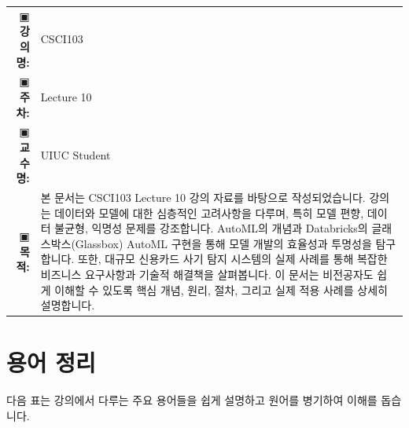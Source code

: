 \documentclass[11pt,a4paper]{article}
\makeatletter
\theoremstyle{definition}
\newcommand{\metainfo}[4]{
\begin{tcolorbox}[
    colback=lightpurple,
    colframe=darkpurple,
    boxrule=1pt,
    arc=2mm,
    left=10pt,
    right=10pt,
    top=8pt,
    bottom=8pt
]
\begin{tabular}{@{}rl@{}}
▣ \textbf{강의명:} & #1 \\[0.3em]
▣ \textbf{주차:} & #2 \\[0.3em]
▣ \textbf{교수명:} & #3 \\[0.3em]
▣ \textbf{목적:} & \begin{minipage}[t]{0.75\textwidth}#4\end{minipage}
\end{tabular}
\end{tcolorbox}
}
\makeatother
\begin{document}
\thispagestyle{firstpage}

\metainfo{CSCI103}{Lecture 10}{UIUC Student}{본 문서는 CSCI103 Lecture 10 강의 자료를 바탕으로 작성되었습니다. 강의는 데이터와 모델에 대한 심층적인 고려사항을 다루며, 특히 모델 편향, 데이터 불균형, 익명성 문제를 강조합니다. AutoML의 개념과 Databricks의 글래스박스(Glassbox) AutoML 구현을 통해 모델 개발의 효율성과 투명성을 탐구합니다. 또한, 대규모 신용카드 사기 탐지 시스템의 실제 사례를 통해 복잡한 비즈니스 요구사항과 기술적 해결책을 살펴봅니다. 이 문서는 비전공자도 쉽게 이해할 수 있도록 핵심 개념, 원리, 절차, 그리고 실제 적용 사례를 상세히 설명합니다.}

\tableofcontents

\newpage


\section*{용어 정리}

다음 표는 강의에서 다루는 주요 용어들을 쉽게 설명하고 원어를 병기하여 이해를 돕습니다.
\end{document}
